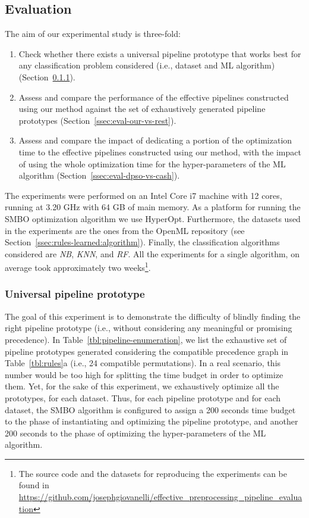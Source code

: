 \subsection{Evaluation}
\label{ssec:evaluation}

The aim of our experimental study is three-fold:
\begin{enumerate}
    \item Check whether there exists a universal pipeline prototype that works best for any classification problem considered  (i.e., dataset and ML algorithm) (Section~\ref{ssec:eval-universal-pipeline}).
    \item Assess and compare the performance of the effective pipelines constructed using our method against the set of exhaustively generated pipeline prototypes (Section~\ref{ssec:eval-our-vs-rest}).
    \item Assess and compare the impact of dedicating a portion of the optimization time to the effective pipelines constructed using our method, with the impact of using the whole optimization time for the hyper-parameters of the ML algorithm (Section~\ref{ssec:eval-dpso-vs-cash}).
\end{enumerate}

The experiments were performed on an Intel Core i7 machine with 12 cores, running at 3.20 GHz with 64 GB of main memory. As a platform for running the SMBO optimization algorithm we use HyperOpt. Furthermore, the datasets used in the experiments are the ones from the OpenML repository (see Section~\ref{ssec:rules-learned:algorithm}). Finally, the classification algorithms considered are \textit{NB}, \textit{KNN}, and \textit{RF}. All the experiments for a single algorithm, on average took approximately two weeks\footnote{The source code and the datasets for reproducing the experiments can be found in 
\href{https://github.com/josephgiovanelli/effective\_preprocessing\_pipeline\_evaluation}{https://github.com/josephgiovanelli/effective\_preprocessing\_pipeline\_evaluation}}.

\subsubsection{Universal pipeline prototype}
\label{ssec:eval-universal-pipeline}
The goal of this experiment is to demonstrate the difficulty of blindly finding the right pipeline prototype (i.e., without considering any meaningful or promising precedence).
In Table~\ref{tbl:pipeline-enumeration}, we list the exhaustive set of pipeline prototypes generated considering the compatible precedence graph in Table~\ref{tbl:rules}a (i.e., 24 compatible permutations). In a real scenario, this number would be too high for splitting the time budget in order to optimize them. 
Yet, for the sake of this experiment, we exhaustively optimize all the prototypes, for each dataset. Thus, for each pipeline prototype and for each dataset, the SMBO algorithm is configured to assign a 200 seconds time budget to the phase of instantiating and optimizing the pipeline prototype, and another 200 seconds to the phase of optimizing the hyper-parameters of the ML algorithm.

